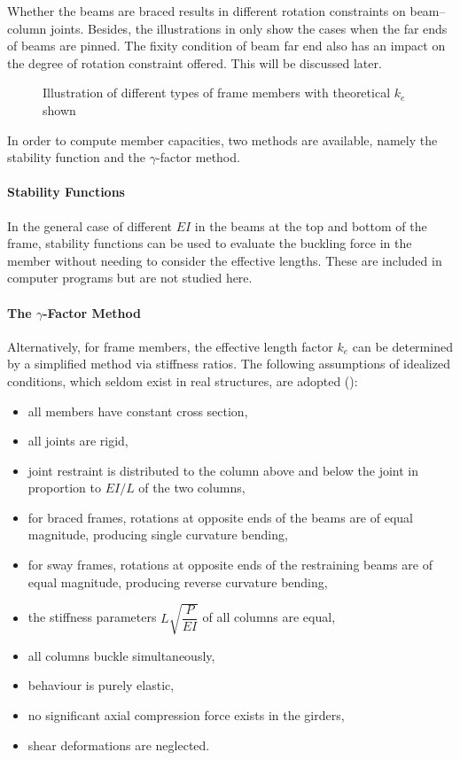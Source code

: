 Whether the beams are braced results in different rotation constraints on beam--column joints. Besides, the illustrations in  only show the cases when the far ends of beams are pinned. The fixity condition of beam far end also has an impact on the degree of rotation constraint offered. This will be discussed later.
\begin{figure}[ht!]
\centering

\caption{Illustration of different types of frame members with theoretical $k_e$ shown}\label{fig:fm}
\end{figure}

In order to compute member capacities, two methods are available, namely the stability function and the $\gamma$-factor method.
\paragraph{Stability Functions}
In the general case of different $EI$ in the beams at the top and bottom of the frame, stability functions can be used to evaluate the buckling force in the member without needing to consider the effective lengths. These are included in computer programs but are not studied here.
\paragraph{The $\gamma$-Factor Method}
Alternatively, for frame members, the effective length factor $k_e$ can be determined by a simplified method via stiffness ratios. The following assumptions of idealized conditions, which seldom exist in real structures, are adopted ():
\begin{itemize}
\item all members have constant cross section,
\item all joints are rigid,
\item joint restraint is distributed to the column above and below the joint in proportion to $EI/L$ of the two columns,
\item for braced frames, rotations at opposite ends of the beams are of equal magnitude, producing single curvature bending,
\item for sway frames, rotations at opposite ends of the restraining beams are of equal magnitude, producing reverse curvature bending,
\item the stiffness parameters $L\sqrt{\dfrac{P}{EI}}$ of all columns are equal,
\item all columns buckle simultaneously,
\item behaviour is purely elastic,
\item no significant axial compression force exists in the girders,
\item shear deformations are neglected.
\end{itemize}


